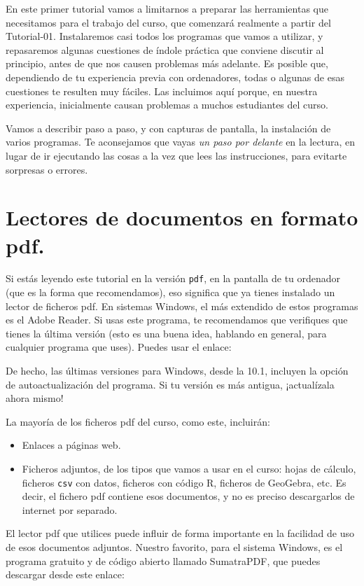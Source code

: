 \documentclass[10pt,a4paper]{article}
\newcounter {cont01}
\begin{document}
En este primer tutorial vamos a limitarnos a preparar las herramientas que necesitamos para el
trabajo del curso, que comenzará realmente a partir del Tutorial-01. Instalaremos casi todos los
programas que vamos a utilizar, y repasaremos algunas cuestiones de índole práctica que conviene
discutir al principio, antes de que nos causen problemas más adelante. Es posible que, dependiendo
de tu experiencia previa con ordenadores, todas o algunas de esas cuestiones te resulten muy
fáciles. Las incluimos aquí porque, en nuestra experiencia, inicialmente causan problemas a muchos
estudiantes del curso.

Vamos a describir paso a paso, y con capturas de pantalla, la instalación de varios programas. Te
aconsejamos que vayas {\em un paso por delante} en la lectura, en lugar de ir ejecutando las cosas
a la vez que lees las instrucciones, para evitarte sorpresas o errores.

\section{Lectores de documentos en formato pdf.}
\label{tut00:sec:LectoresPdf}

Si estás leyendo este tutorial en la versión {\tt pdf}, en la pantalla de tu ordenador (que es la
forma que recomendamos), eso significa que ya tienes instalado un lector de ficheros pdf. En
sistemas Windows, el más extendido de estos programas es el Adobe Reader. Si usas este programa, te
recomendamos que verifiques que tienes la última versión (esto es una buena idea, hablando en
general, para cualquier programa que uses). Puedes usar el enlace:
\begin{center}
\end{center}
De hecho, las últimas versiones para Windows, desde la 10.1, incluyen la opción de
autoactualización del programa. Si tu versión es más antigua, ¡actualízala ahora mismo!

La mayoría de los ficheros pdf del curso, como este, incluirán:
\begin{itemize}
  \item Enlaces a páginas web.
  \item Ficheros adjuntos, de los tipos que vamos a usar en el curso: hojas de cálculo, ficheros
      {\tt csv}  con datos, ficheros con código R, ficheros de GeoGebra, etc.  Es decir, el
      fichero pdf contiene esos documentos, y no es preciso descargarlos de internet por
      separado.
\end{itemize}
El lector pdf que utilices puede influir de forma importante en la facilidad de uso de esos
documentos adjuntos. Nuestro favorito, para el sistema Windows, es el programa gratuito y de código
abierto llamado SumatraPDF, que puedes descargar desde este enlace:
\begin{center}
\end{center}
\end{document}
